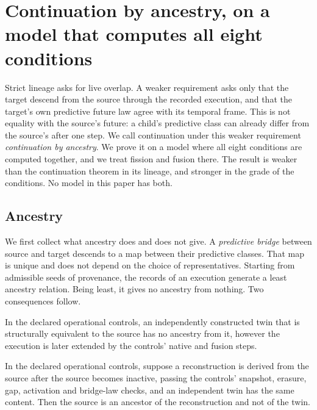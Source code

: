 \section{Continuation by ancestry, on a model that computes all eight conditions}
\label{sec:ancestry}

Strict lineage asks for live overlap. A weaker requirement asks only that the
target descend from the source through the recorded execution, and that the
target's own predictive future law agree with its temporal frame. This is not
equality with the source's future: a child's predictive class can already
differ from the source's after one step. We call continuation under this weaker requirement
\emph{continuation by ancestry}. We prove it on a model where all eight
conditions are computed together, and we treat fission and fusion there. The
result is weaker than the continuation theorem in its lineage, and stronger in
the grade of the conditions. No model in this paper has both.

\subsection{Ancestry}

We first collect what ancestry does and does not give. A \emph{predictive
bridge} between source and target descends to a map between their predictive
classes. That map is unique and does not depend on the choice of
representatives. Starting from admissible seeds of provenance, the records of
an execution generate a least ancestry relation. Being least, it gives no
ancestry from nothing. Two consequences follow.

\begin{proposition}
\label{prop:twin}
In the declared operational controls, an independently constructed twin that
is structurally equivalent to the source has no ancestry from it, however the
execution is later extended by the controls' native and fusion steps.
\end{proposition}

\begin{proposition}
\label{prop:reconstruction}
In the declared operational controls, suppose a reconstruction is derived
from the source after the source becomes inactive, passing the controls'
snapshot, erasure, gap, activation and bridge-law checks, and an independent
twin has the same content. Then the source is an ancestor of the
reconstruction and not of the twin.
\end{proposition}


